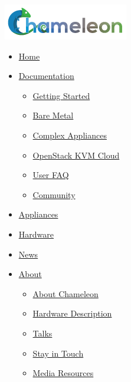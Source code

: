 \href{https://www.chameleoncloud.org/}{\includegraphics[width=\columnwidth]{images/chameleon/logo.png}
{}}

\hypertarget{main-nav}{}
\begin{itemize}
\item
  \href{https://www.chameleoncloud.org/}{\emph{}{Home}}
\item
  \href{openstack-kvm-user-guide.html\#}{Documentation {}}

  \begin{itemize}
    \item
    \href{https://www.chameleoncloud.org/docs/getting-started/}{{Getting
    Started}}
  \item
    \href{https://www.chameleoncloud.org/docs/bare-metal-user-guide/}{{Bare
    Metal}}
  \item
    \href{https://www.chameleoncloud.org/docs/complex-appliances/}{{Complex
    Appliances}}
  \item
    \href{https://www.chameleoncloud.org/docs/openstack-kvm-cloud/}{{OpenStack
    KVM Cloud}}
  \item
    \href{https://www.chameleoncloud.org/docs/user-faq/}{{User FAQ}}
  \item
    \href{https://www.chameleoncloud.org/docs/community/}{{Community}}
  \end{itemize}
\item
  \href{https://www.chameleoncloud.org/appliances/}{{Appliances}}
\item
  \href{https://www.chameleoncloud.org/hardware/}{{Hardware}}
\item
  \href{https://www.chameleoncloud.org/news/}{{News}}
\item
  \href{openstack-kvm-user-guide.html\#}{About {}}

  \begin{itemize}
    \item
    \href{https://www.chameleoncloud.org/about/chameleon/}{{About
    Chameleon}}
  \item
    \href{https://www.chameleoncloud.org/about/hardware-description/}{{Hardware
    Description}}
  \item
    \href{https://www.chameleoncloud.org/talks/}{{Talks}}
  \item
    \href{https://www.chameleoncloud.org/about/newsletter/}{{Stay in
    Touch}}
  \item
    \href{https://www.chameleoncloud.org/about/media-resources/}{{Media
    Resources}}
  \end{itemize}
\end{itemize}

